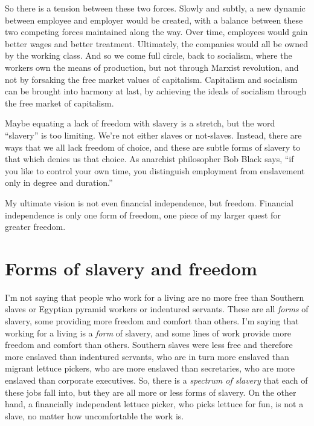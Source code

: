 So there is a tension between these two forces. Slowly and subtly, a new dynamic between employee and employer would be created, with a balance between these two competing forces maintained along the way. Over time, employees would gain better wages and better treatment. Ultimately, the companies would all be owned by the working class. And so we come full circle, back to socialism, where the workers own the means of production, but not through Marxist revolution, and not by forsaking the free market values of capitalism. Capitalism and socialism can be brought into harmony at last, by achieving the ideals of socialism through the free market of capitalism.

Maybe equating a lack of freedom with slavery is a stretch, but the word ``slavery'' is too limiting. We're not either slaves or not-slaves. Instead, there are ways that we all lack freedom of choice, and these are subtle forms of slavery to that which denies us that choice. As anarchist philosopher Bob Black says, ``if you like to control your own time, you distinguish employment from enslavement only in degree and duration.''

My ultimate vision is not even financial independence, but freedom. Financial independence is only one form of freedom, one piece of my larger quest for greater freedom.

\section{Forms of slavery and freedom}
I'm not saying that people who work for a living are no more free than Southern slaves or Egyptian pyramid workers or indentured servants. These are all \emph{forms} of slavery, some providing more freedom and comfort than others. I'm saying that working for a living is a \emph{form} of slavery, and some lines of work provide more freedom and comfort than others. Southern slaves were less free and therefore more enslaved than indentured servants, who are in turn more enslaved than migrant lettuce pickers, who are more enslaved than secretaries, who are more enslaved than corporate executives. So, there is a \emph{spectrum of slavery} that each of these jobs fall into, but they are all more or less forms of slavery. On the other hand, a financially independent lettuce picker, who picks lettuce for fun, is not a slave, no matter how uncomfortable the work is.

